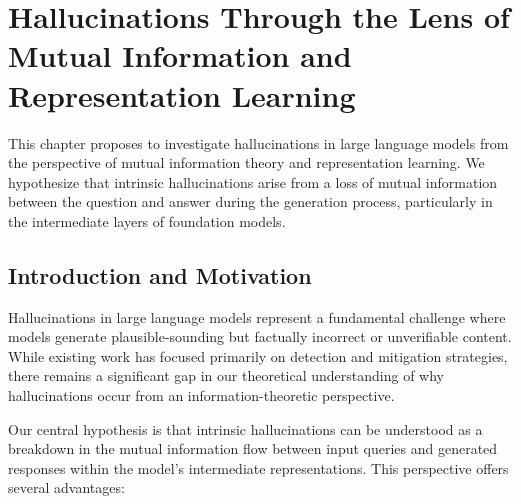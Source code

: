 \chapter{Hallucinations Through the Lens of Mutual Information and Representation Learning}
\label{chp:hallucinations}

This chapter proposes to investigate hallucinations in large language models from the perspective of mutual information theory and representation learning. We hypothesize that intrinsic hallucinations arise from a loss of mutual information between the question and answer during the generation process, particularly in the intermediate layers of foundation models.

\section{Introduction and Motivation}
\label{sec:hall_intro}

Hallucinations in large language models represent a fundamental challenge where models generate plausible-sounding but factually incorrect or unverifiable content. While existing work has focused primarily on detection and mitigation strategies, there remains a significant gap in our theoretical understanding of why hallucinations occur from an information-theoretic perspective.

Our central hypothesis is that intrinsic hallucinations can be understood as a breakdown in the mutual information flow between input queries and generated responses within the model's intermediate representations. This perspective offers several advantages:

